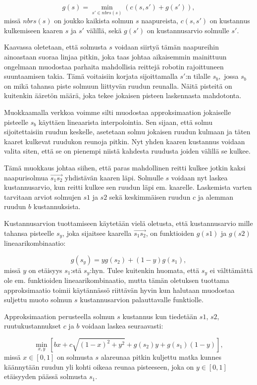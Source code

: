 \documentclass[finnish]{tktltiki2}
\theoremstyle{definition}
\theoremstyle{remark}
\begin{document}
\[g(s) = \min_{s'\in nbrs(s)} (c(s, s') +g(s')),\]
missä \(nbrs(s)\) on joukko kaikista solmun \(s\) naapureista, \(c(s,s')\) on kustannus kulkemiseen kaaren \(s\) ja \(s'\) välillä, sekä \(g(s')\) on kustannusarvio solmulle \(s'\).

Kaavassa oletetaan, että solmusta \(s\) voidaan siirtyä tämän naapureihin ainoastaan suoraa linjaa pitkin, joka taas johtaa aikaisemmin mainittuun ongelmaan muodostaa parhaita mahdollisia reittejä robotin rajoittuneen suuntaamisen takia. Tämä voitaisiin korjata sijoittamalla \(s'\):n tilalle \(s_b,\) jossa \(s_b\) on mikä tahansa piste solmuun liittyvän ruudun reunalla. Näitä pisteitä on kuitenkin ääretön määrä, joka tekee jokaisen pisteen laskennasta mahdotonta.

Muokkaamalla verkkoa voimme silti muodostaa approksimaation jokaiselle pisteelle \(s_b\) käyttäen lineaarista interpolointia. Sen sijaan, että solmu sijoitettaisiin ruudun keskelle, asetetaan solmu jokaisen ruudun kulmaan ja täten kaaret kulkevat ruudukon reunoja pitkin. Nyt yhden kaaren kustannus voidaan valita siten, että se on pienempi niistä kahdesta ruudusta joiden välillä se kulkee.

Tämä muokkaus johtaa siihen, että paras mahdollinen reitti kulkee jotkin kaksi naapurisolmua $\overrightarrow{s_1s_2}$ yhdistävän kaaren läpi. Solmulle \(s\) voidaan nyt laskea kustannusarvio, kun reitti kulkee sen ruudun läpi em. kaarelle. Laskemista varten tarvitaan arviot solmujen \(s1\) ja \(s2\) sekä keskimmäisen ruudun \(c\) ja alemman ruudun \(b\) kustannuksista.

Kustannusarvion tuottamiseen käytetään vielä oletusta, että kustannusarvio mille tahansa pisteelle \(s_y\), joka sijaitsee kaarella $\overrightarrow{s_1s_2}$, on funktioiden \(g(s1)\) ja \(g(s2)\) lineaarikombinaatio:

\[g(s_y) = yg(s_2)+(1-y)g(s_1),\]
missä \(y\) on etäisyys \(s_1\):stä \(s_y\):hyn. Tulee kuitenkin huomata, että \(s_y\) ei välttämättä ole em. funktioiden lineaarikombinaatio, mutta tämän oletuksen tuottama approksimaatio toimii käytännässö riittävän hyvin kun halutaan muodostaa suljettu muoto solmun \(s\) kustannusarvion palauttavalle funktiolle.

Approksimaation perusteella solmun \(s\) kustannus kun tiedetään \(s1\), \(s2\), ruutukustannukset \(c\) ja \(b\) voidaan laskea seuraavasti:

\[\min_{x,y}[bx+c\sqrt{(1-x)^2+y^2}+g(s_2)y+g(s_1)(1-y)],\]
missä $x \in [0,1]$ on solmusta $s$ alareunaa pitkin kuljettu matka kunnes käännytään ruudun yli kohti oikeaa reunaa pisteeseen, joka on $y \in [0,1]$ etäisyyden päässä solmusta $s_1$.
\end{document}
